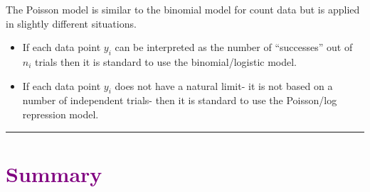 \documentclass[
  letterpaper,
  DIV=11,
  numbers=noendperiod]{scrreprt}
\begin{document}
The Poisson model is similar to the binomial model for count data but is
applied in slightly different situations.

\begin{itemize}
\item
  If each data point \(y_i\) can be interpreted as the number of
  ``successes'' out of \(n_i\) trials then it is standard to use the
  binomial/logistic model.
\item
  If each data point \(y_i\) does not have a natural limit- it is not
  based on a number of independent trials- then it is standard to use
  the Poisson/log repression model.
\end{itemize}

\begin{center}\rule{0.5\linewidth}{0.5pt}\end{center}

\hypertarget{section-8}{%
\section*{\texorpdfstring{\textcolor{purple}{Summary}}{}}\label{section-8}}

\markright{\textcolor{purple}{Summary}}
\end{document}
